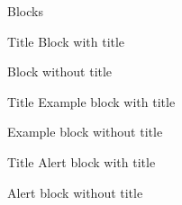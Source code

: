 \documentclass[%
  handout,
  aspectratio=1610,
  10pt,
  onlytextwidth, %
]{beamer}
\begin{document}
\begin{frame}{Blocks}
  \begin{block}{Title}
    Block with title
  \end{block}

  \begin{block}{}
    Block without title
  \end{block}

  \begin{exampleblock}{Title}
    Example block with title
  \end{exampleblock}

  \begin{exampleblock}{}
    Example block without title
  \end{exampleblock}

  \begin{alertblock}{Title}
    Alert block with title
  \end{alertblock}

  \begin{alertblock}{}
    Alert block without title
  \end{alertblock}
\end{frame}
\end{document}
